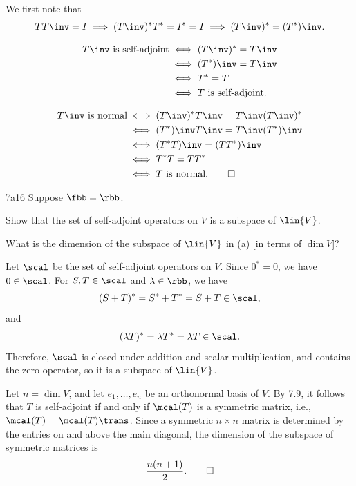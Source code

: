 \begin{sol}
    We first note that
    \[
        TT\inv = I \implies (T\inv)^\ast T^\ast = I^\ast = I \implies (T\inv)^\ast = (T^\ast)\inv.
    \]
    \begin{subexercises}
        \item
        \begin{align*}
            T\inv \text{ is self-adjoint} &\iff (T\inv)^\ast = T\inv \\
            &\iff (T^\ast)\inv = T\inv \\
            &\iff T^\ast = T \\
            &\iff T \text{ is self-adjoint}.
        \end{align*}
        \item
        \begin{align*}
            T\inv \text{ is normal} &\iff (T\inv)^\ast T\inv = T\inv (T\inv)^\ast \\
            &\iff (T^\ast)\inv T\inv = T\inv (T^\ast)\inv \\
            &\iff (T^\ast T)\inv = (TT^\ast)\inv \\
            &\iff T^\ast T = TT^\ast \\
            &\iff T \text{ is normal}. \qedhere
        \end{align*}
    \end{subexercises}
\end{sol}

\begin{exercise}{7a16}
    Suppose $\fbb = \rbb$.
    \begin{subexercises}
        \item Show that the set of self-adjoint operators on $V$ is a subspace of $\lin{V}$.
        \item What is the dimension of the subspace of $\lin{V}$ in (a) [in terms of $\dim V$]?
    \end{subexercises}
\end{exercise}

\begin{solenum}
    \item Let $\scal$ be the set of self-adjoint operators on $V$.
    Since $0^\ast = 0$, we have $0 \in \scal$.
    For $S, T \in \scal$ and $\lambda \in \rbb$, we have
    \[
        (S + T)^\ast = S^\ast + T^\ast = S + T \in \scal,
    \]
    and
    \[
        (\lambda T)^\ast = \bar{\lambda} T^\ast = \lambda T \in \scal.
    \]
    Therefore, $\scal$ is closed under addition and scalar multiplication, and contains the zero operator, so it is a subspace of $\lin{V}$.
    \item Let $n = \dim V$, and let $e_1, \dots, e_n$ be an orthonormal basis of $V$.
    By 7.9, it follows that $T$ is self-adjoint if and only if $\mcal(T)$ is a symmetric matrix, i.e., $\mcal(T) = \mcal(T)\trans$.
    Since a symmetric $n \times n$ matrix is determined by the entries on and above the main diagonal, the dimension of the subspace of symmetric matrices is
    \[
        \frac{n(n+1)}{2}. \qedhere
    \]
\end{solenum}

